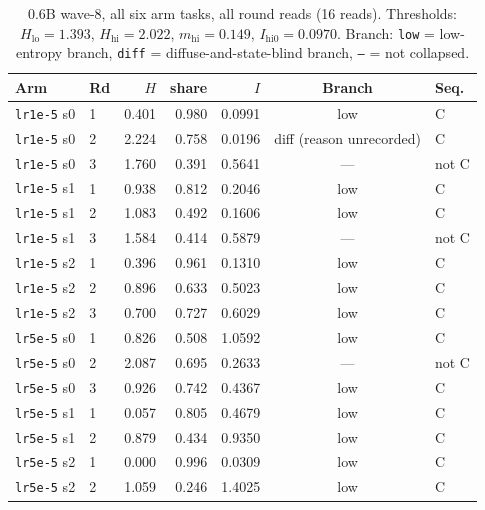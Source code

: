 \documentclass[11pt,a4paper]{article}
\begin{document}
\begin{table}[h]
\centering
\footnotesize
\caption{0.6B wave-8, all six arm tasks, all round reads (16 reads). Thresholds:
$H_{\mathrm{lo}}{=}1.393$, $H_{\mathrm{hi}}{=}2.022$, $m_{\mathrm{hi}}{=}0.149$,
$I_{\mathrm{hi0}}{=}0.0970$. Branch: \texttt{low} = low-entropy branch,
\texttt{diff} = diffuse-and-state-blind branch, \texttt{---} = not collapsed.}
\label{tab:s2b}
\begin{tabular}{@{}llrrrcl@{}}
\toprule
\textbf{Arm} & \textbf{Rd} & $H$ & \textbf{share} & $I$ & \textbf{Branch} & \textbf{Seq.} \\
\midrule
\texttt{lr1e-5} s0 & 1 & 0.401 & 0.980 & 0.0991 & low & C \\
\texttt{lr1e-5} s0 & 2 & 2.224 & 0.758 & 0.0196 & diff (reason unrecorded) & C \\
\texttt{lr1e-5} s0 & 3 & 1.760 & 0.391 & 0.5641 & --- & not C \\
\texttt{lr1e-5} s1 & 1 & 0.938 & 0.812 & 0.2046 & low & C \\
\texttt{lr1e-5} s1 & 2 & 1.083 & 0.492 & 0.1606 & low & C \\
\texttt{lr1e-5} s1 & 3 & 1.584 & 0.414 & 0.5879 & --- & not C \\
\texttt{lr1e-5} s2 & 1 & 0.396 & 0.961 & 0.1310 & low & C \\
\texttt{lr1e-5} s2 & 2 & 0.896 & 0.633 & 0.5023 & low & C \\
\texttt{lr1e-5} s2 & 3 & 0.700 & 0.727 & 0.6029 & low & C \\
\midrule
\texttt{lr5e-5} s0 & 1 & 0.826 & 0.508 & 1.0592 & low & C \\
\texttt{lr5e-5} s0 & 2 & 2.087 & 0.695 & 0.2633 & --- & not C \\
\texttt{lr5e-5} s0 & 3 & 0.926 & 0.742 & 0.4367 & low & C \\
\texttt{lr5e-5} s1 & 1 & 0.057 & 0.805 & 0.4679 & low & C \\
\texttt{lr5e-5} s1 & 2 & 0.879 & 0.434 & 0.9350 & low & C \\
\texttt{lr5e-5} s2 & 1 & 0.000 & 0.996 & 0.0309 & low & C \\
\texttt{lr5e-5} s2 & 2 & 1.059 & 0.246 & 1.4025 & low & C \\
\bottomrule
\end{tabular}
\end{table}
\end{document}
